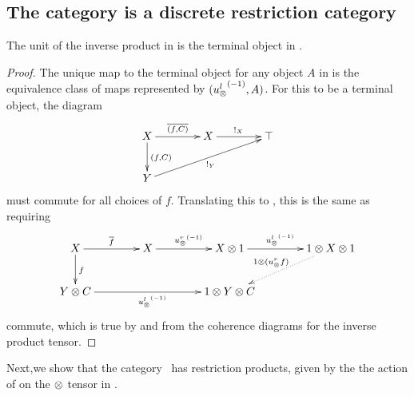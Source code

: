 \subsection{The category \hypXt is a discrete restriction category} %
\label{sub:the_category_hypxt_is_cartesian}



\begin{lemma}\label{lem:tensor_unit_of_x_is_terminal_object_of_xt}
  The unit of the inverse product in \X is the terminal object in \Xt.
\end{lemma}
\begin{proof}
  The unique map to the terminal object for any object $A$ in \Xt is the equivalence class of maps
  represented by $({u_{\otimes}^l}^{(-1)},A)$. For this to be a terminal object, the diagram
  \[
    \xymatrix @C=40pt @R=25pt{
      X \ar[r]^{\restr{(f,C)}} \ar[d]^{(f,C)} & X \ar[r]^{!_X}  &\top  \\
      Y \ar[urr]_{!_Y}
    }
  \]
  must commute for all choices of $f$. Translating this to \X, this is the same as requiring
  \[
    \xymatrix @C=40pt @R=25pt{
      X \ar[r]^{\restr{f}} \ar[d]^{f} & X \ar[r]^{\inv{\usr} }
      & X\*1 \ar[r]^{\inv{\usl}}  &1\*X\*1 \ar@{.>}[dl]_{1\*(\usr f)}  \\
      Y \*C\ar[rr]_{\inv{\usl}} & & 1 \*Y \* C
    }
  \]
  commute, which is true by \rone and from the coherence diagrams for the inverse product tensor.
\end{proof}

Next,we show that the category \Xt\ has restriction products, given by the the action of \wtc on
the $\otimes$ tensor in \X.

